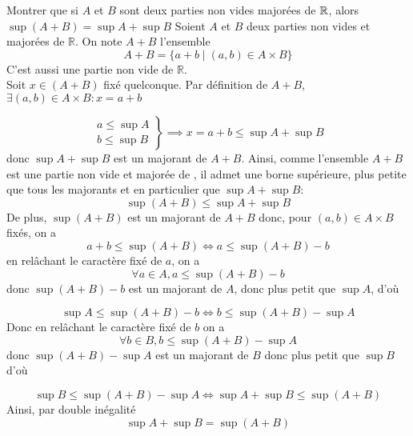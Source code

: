 \documentclass{article}
\renewenvironment{question_kholle}[2][ ]
{
	\subsection{\texorpdfstring{#2}{}}
	\notblank{#1}
	{
		\noindent #1
		\bigbreak
	}
	{}
	\begin{proof}
}
{
	\end{proof}
}
\begin{document}
\begin{question_kholle}[]{Montrer que si $A$ et $B$ sont deux parties non vides majorées de $\mathbb R$, alors $\sup(A+B) = \sup A + \sup B$}
	Soient $A$ et $B$ deux parties non vides et majorées de $\mathbb{R}$. On note $A+B$ l'ensemble
	$$
		A+B = \{ a+b \mid (a, b) \in A\times B \}
	$$
	C'est aussi une partie non vide de $\mathbb{R}$.\\
	Soit $x \in (A+B)$ fixé quelconque. Par définition de $A+B$, $\exists(a, b) \in A\times B : x=a+b$

	$$
		\left. \begin{array}{ll}
			a \leqslant \sup A \\
			b \leqslant \sup B
		\end{array}\right\} \implies x = a+b \leqslant \sup A + \sup B
	$$
	donc $\sup A+\sup B$ est un majorant de $A+B$. Ainsi, comme l’ensemble $A+B$ est une partie non vide et majorée de \R, il admet une borne supérieure, plus petite que tous les majorants et en particulier que $\sup A+\sup B$:
	$$\sup(A+B) \leqslant \sup A + \sup B$$
	De plus, $\sup(A+B)$ est un majorant de $A+B$ donc, pour $(a, b) \in A\times B$ fixés, on a
	$$
		a+b \leqslant \sup (A+B) \iff a \leqslant \sup(A+B) -b
	$$
	en relâchant le caractère fixé de $a$, on a
	$$
		\forall a \in A, a\leqslant \sup(A+B) - b
	$$
	donc $\sup(A+B) - b$ est un majorant de $A$, donc plus petit que $\sup A$, d'où

	$$
		\sup A \leqslant \sup(A+B) - b \iff b \leqslant \sup(A+B) - \sup A
	$$
	Donc en relâchant le caractère fixé de $b$ on a
	$$
		\forall b \in B, b\leqslant \sup(A+B) - \sup A
	$$
	donc $\sup(A+B) - \sup A$ est un majorant de $B$ donc plus petit que $\sup B$
	d'où

	$$
		\sup B \leqslant \sup(A+B) - \sup A \iff \sup A + \sup B \leqslant \sup (A+B)
	$$
	Ainsi, par double inégalité
	$$
		\sup A + \sup B = \sup (A+B)
	$$

\end{question_kholle}
\end{document}
